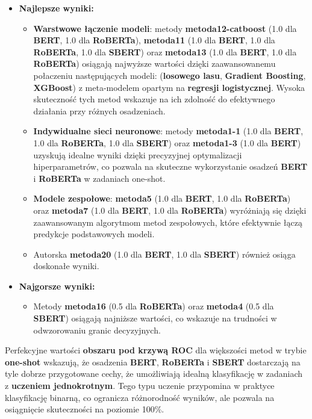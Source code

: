\begin{itemize}
	\item \textbf{Najlepsze wyniki:}
	      \begin{itemize}
		      \item \textbf{Warstwowe łączenie modeli}: metody \textbf{metoda12-catboost} (1.0 dla \textbf{BERT}, 1.0 dla \textbf{RoBERTa}), \textbf{metoda11} (1.0 dla \textbf{BERT}, 1.0 dla \textbf{RoBERTa}, 1.0 dla \textbf{SBERT}) oraz \textbf{metoda13} (1.0 dla \textbf{BERT}, 1.0 dla \textbf{RoBERTa}) osiągają najwyższe wartości dzięki zaawansowanemu połaczeniu następujących modeli: (\textbf{losowego lasu}, \textbf{Gradient Boosting}, \textbf{XGBoost}) z meta-modelem opartym na \textbf{regresji logistycznej}. Wysoka skuteczność tych metod wskazuje na ich zdolność do efektywnego działania przy różnych osadzeniach.
		      \item \textbf{Indywidualne sieci neuronowe}: metody \textbf{metoda1-1} (1.0 dla \textbf{BERT}, 1.0 dla \textbf{RoBERTa}, 1.0 dla \textbf{SBERT}) oraz \textbf{metoda1-3} (1.0 dla \textbf{BERT}) uzyskują idealne wyniki dzięki precyzyjnej optymalizacji hiperparametrów, co pozwala na skuteczne wykorzystanie osadzeń \textbf{BERT} i \textbf{RoBERTa} w zadaniach one-shot.
		      \item \textbf{Modele zespołowe}: \textbf{metoda5} (1.0 dla \textbf{BERT}, 1.0 dla \textbf{RoBERTa}) oraz \textbf{metoda7} (1.0 dla \textbf{BERT}, 1.0 dla \textbf{RoBERTa}) wyróżniają się dzięki zaawansowanym algorytmom metod zespołowych, które efektywnie łączą predykcje podstawowych modeli.
		      \item Autorska \textbf{metoda20} (1.0 dla \textbf{BERT}, 1.0 dla \textbf{SBERT}) również osiąga doskonałe wyniki.
	      \end{itemize}
	\item \textbf{Najgorsze wyniki:}
	      \begin{itemize}
		      \item Metody \textbf{metoda16} (0.5 dla \textbf{RoBERTa}) oraz \textbf{metoda4} (0.5 dla \textbf{SBERT}) osiągają najniższe wartości, co wskazuje na trudności w odwzorowaniu granic decyzyjnych.
	      \end{itemize}
\end{itemize}

Perfekcyjne wartości \textbf{obszaru pod krzywą ROC} dla większości metod w trybie \textbf{one-shot} wskazują, że osadzenia \textbf{BERT}, \textbf{RoBERTa} i \textbf{SBERT} dostarczają na tyle dobrze przygotowane cechy, że umożliwiają idealną klasyfikację w zadaniach z \textbf{uczeniem jednokrotnym}. Tego typu uczenie przypomina w praktyce klasyfikację binarną, co ogranicza różnorodność wyników, ale pozwala na osiągnięcie skuteczności na poziomie 100\%.

